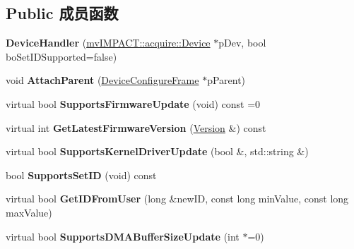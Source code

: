 \subsection*{Public 成员函数}
\begin{DoxyCompactItemize}
\item 
\hypertarget{class_device_handler_a45710070c6b9145f888c07fd955c7eb6}{{\bfseries Device\+Handler} (\hyperlink{classmv_i_m_p_a_c_t_1_1acquire_1_1_device}{mv\+I\+M\+P\+A\+C\+T\+::acquire\+::\+Device} $\ast$p\+Dev, bool bo\+Set\+I\+D\+Supported=false)}\label{class_device_handler_a45710070c6b9145f888c07fd955c7eb6}

\item 
\hypertarget{class_device_handler_a9d5a6570a2d8eac72c9cc4c048959d79}{void {\bfseries Attach\+Parent} (\hyperlink{class_device_configure_frame}{Device\+Configure\+Frame} $\ast$p\+Parent)}\label{class_device_handler_a9d5a6570a2d8eac72c9cc4c048959d79}

\item 
\hypertarget{class_device_handler_a5289ea34aabf68d0b5ba3feb1744be2f}{virtual bool {\bfseries Supports\+Firmware\+Update} (void) const =0}\label{class_device_handler_a5289ea34aabf68d0b5ba3feb1744be2f}

\item 
\hypertarget{class_device_handler_a511f371a39972274961eb6ce392feb42}{virtual int {\bfseries Get\+Latest\+Firmware\+Version} (\hyperlink{struct_version}{Version} \&) const }\label{class_device_handler_a511f371a39972274961eb6ce392feb42}

\item 
\hypertarget{class_device_handler_a3c2c21792e6f4510cd0494860b756a3c}{virtual bool {\bfseries Supports\+Kernel\+Driver\+Update} (bool \&, std\+::string \&)}\label{class_device_handler_a3c2c21792e6f4510cd0494860b756a3c}

\item 
\hypertarget{class_device_handler_ab4326fb800b59848ce13aea6ffa1e556}{bool {\bfseries Supports\+Set\+I\+D} (void) const }\label{class_device_handler_ab4326fb800b59848ce13aea6ffa1e556}

\item 
\hypertarget{class_device_handler_aed3e75c5392a422d815e5a5b763e393c}{virtual bool {\bfseries Get\+I\+D\+From\+User} (long \&new\+I\+D, const long min\+Value, const long max\+Value)}\label{class_device_handler_aed3e75c5392a422d815e5a5b763e393c}

\item 
\hypertarget{class_device_handler_a8c66c91677c0ec13b12348736c23d37e}{virtual bool {\bfseries Supports\+D\+M\+A\+Buffer\+Size\+Update} (int $\ast$=0)}\label{class_device_handler_a8c66c91677c0ec13b12348736c23d37e}


\end{DoxyCompactItemize}
